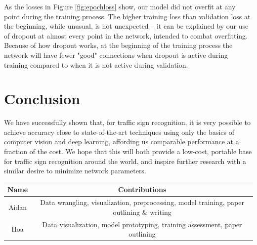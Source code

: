 \documentclass[10pt,twocolumn,letterpaper]{article}
\begin{document}
As the losses in Figure \ref{fig:epochloss} show, our model did not overfit at any point during the training process. The higher training loss than validation loss at the beginning, while unusual, is not unexpected -- it can be explained by our use of dropout at almost every point in the network, intended to combat overfitting. Because of how dropout works, at the beginning of the training process the network will have fewer "good" connections when dropout is active during training compared to when it is not active during validation. 

\section{Conclusion}
We have successfully shown that, for traffic sign recognition, it is very possible to achieve accuracy close to state-of-the-art techniques using only the basics of computer vision and deep learning, affording us comparable performance at a fraction of the cost. We hope that this will both provide a low-cost, portable base for traffic sign recognition around the world, and inspire further research with a similar desire to minimize network parameters. 

{\small


}

\begin{center}
\begin{tabular}{ |c|c| } 
\hline
Name & Contributions \\
\hline \hline
Aidan & Data wrangling, visualization, preprocessing, model training, paper outlining \& writing\\
\hline
Hoa & Data visualization, model prototyping, training assessment, paper outlining\\
\hline 
\end{tabular}
\end{center}
\end{document}
